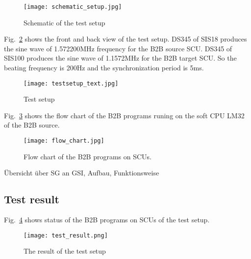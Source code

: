 \begin{figure}[!htb]
   \centering   
   \texttt{[image: schematic\_setup.jpg]}
   \caption{Schematic of the test setup}
   \label{setup}
\end{figure}

Fig.~\ref{testsetup_text} shows the front and back view of the test setup. DS345 of SIS18 produces the sine wave of 1.572200MHz frequency for the B2B source SCU. DS345 of SIS100 produces the sine wave of 1.1572MHz for the B2B target SCU. So the beating frequency is 200Hz and the synchronization period is 5ms. 

\begin{figure}[!htb]
   \centering   
   \texttt{[image: testsetup\_text.jpg]}
   \caption{Test setup}
   \label{testsetup_text}
\end{figure}

Fig.~\ref{flow_chart} shows the flow chart of the B2B programs runing on the soft CPU LM32 of the B2B source.

\begin{figure}[!htb]
   \centering   
   \texttt{[image: flow\_chart.jpg]}
   \caption{Flow chart of the B2B programs on SCUs.}
   \label{flow_chart}
\end{figure}

Übersicht über SG an GSI, Aufbau, Funktionsweise
\subsection{Test result}
Fig.~\ref{test_result} shows status of the B2B programs on SCUs of the test setup.    

\begin{figure}[!htb]
   \centering   
   \texttt{[image: test\_result.png]}
   \caption{The result of the test setup}
   \label{test_result}
\end{figure}


